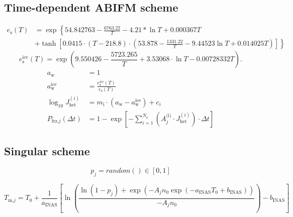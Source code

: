 \documentclass{article}
\begin{document}
\subsection{Time-dependent ABIFM scheme}
\begin{equation}
    \begin{split}
        e_\text{s}(T) &= \exp \left\{ 54.842763 - \frac{6763.22}{T} - 4.21 * \ln{T} + 0.000367T \right.\\
        &+ \left. \tanh \left[{0.0415 \cdot (T - 218.8) \cdot (53.878 - \frac{1331.22}{T} - 9.44523 \ln{T} + 0.014025T)}\right] \right\} \label{eq:2}
    \end{split}
\end{equation}
\begin{equation}
    e_\text{s}^\text{ice} (T) = \exp \left( 9.550426 - \frac{5723.265}{T} + 3.53068 \cdot \ln{T} - 0.00728332T\right). \label{eq:3}
\end{equation}
\begin{align}
  a_{\text{w}} &= 1 \label{eq:4} \\
  a_\text{w}^\text{ice} &= \frac{e_\text{s}^\text{ice}(T)}{e_\text{s}(T)} \label{eq:5} \\
  \log_{10}J_{\text{het}}^{(i)} &= m_{\text{i}} \cdot (a_{\text{w}} - a_\text{w}^\text{ice}) + c_i \label{eq:6} \\
  P_{\text{frz,}j}(\Delta t) &= 1 - \exp\left[ -\sum_{i=1}^{N_{\text{s}}} (A_j^\text{(i)} \cdot J_{\text{het}}^{(i)}) \cdot \Delta t \right] \label{eq:7}
\end{align}

\subsection{Singular scheme}
\begin{equation}
    p_j = random() \in [0,1] \label{eq:8}
\end{equation}

\begin{equation}
    T_{\text{m,}j} = T_0 + \frac{1}{a_\text{INAS}} \left[\ln{\left( \frac{\ln{(1-p_j)} + \exp{\left(-A_j n_0 \exp{\left(-a_\text{INAS} T_0 + b_\text{INAS}\right)}\right)}}{-A_j n_0} \right)} - b_\text{INAS}\right] \label{eq:9}
\end{equation}
\end{document}
